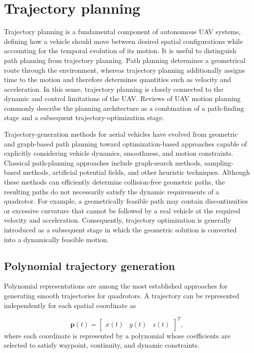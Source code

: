 \section{Trajectory planning}

Trajectory planning is a fundamental component of autonomous \gls{UAV} systems, defining how a vehicle should move between desired spatial configurations while accounting for the temporal evolution of its motion. It is useful to distinguish path planning from trajectory planning. Path planning determines a geometrical route through the environment, whereas trajectory planning additionally assigns time to the motion and therefore determines quantities such as velocity and acceleration. In this sense, trajectory planning is closely connected to the dynamic and control limitations of the \gls{UAV}. Reviews of \gls{UAV} motion planning commonly describe the planning architecture as a combination of a path-finding stage and a subsequent trajectory-optimization stage.\cite{quanSurveyUAVMotion2020} 

Trajectory-generation methods for aerial vehicles have evolved from geometric and graph-based path planning toward optimization-based approaches capable of explicitly considering vehicle dynamics, smoothness, and motion constraints. Classical path-planning approaches include graph-search methods, sampling-based methods, artificial potential fields, and other heuristic techniques. Although these methods can efficiently determine collision-free geometric paths, the resulting paths do not necessarily satisfy the dynamic requirements of a quadrotor. For example, a geometrically feasible path may contain discontinuities or excessive curvature that cannot be followed by a real vehicle at the required velocity and acceleration. Consequently, trajectory optimization is generally introduced as a subsequent stage in which the geometric solution is converted into a dynamically feasible motion. \cite{quanSurveyUAVMotion2020,chenUAVPathplanningAlgorithms2026}

\subsection{Polynomial trajectory generation}

Polynomial representations are among the most established approaches for generating smooth trajectories for quadrotors. A trajectory can be represented independently for each spatial coordinate as

\begin{equation}
    \mathbf{p}(t)=
    \begin{bmatrix}
    x(t) & y(t) & z(t)
    \end{bmatrix}^{T},
\end{equation}
where each coordinate is represented by a polynomial whose coefficients are selected to satisfy waypoint, continuity, and dynamic constraints.

